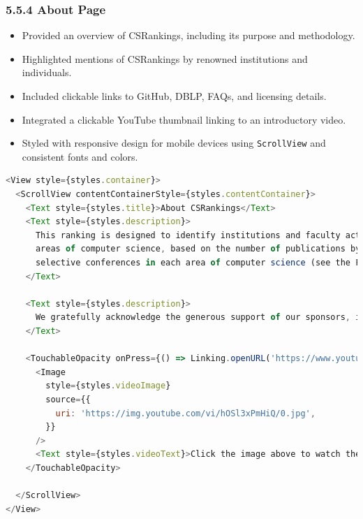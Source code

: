 \documentclass[12pt]{article}
\begin{document}
\subsubsection*{5.5.4 About Page}
\begin{itemize}
    \item Provided an overview of CSRankings, including its purpose and methodology.
    \item Highlighted mentions of CSRankings by renowned institutions and individuals.
    \item Included clickable links to GitHub, DBLP, FAQs, and licensing details.
    \item Integrated a clickable YouTube thumbnail linking to an introductory video.
    \item Styled with responsive design for mobile devices using \texttt{ScrollView} and consistent fonts and colors.
\end{itemize}
\begin{lstlisting}[language=JavaScript, caption={About CSRankings View}, label={lst:AboutCSRankings}]
<View style={styles.container}>
  <ScrollView contentContainerStyle={styles.contentContainer}>
    <Text style={styles.title}>About CSRankings</Text>
    <Text style={styles.description}>
      This ranking is designed to identify institutions and faculty actively engaged in research across a number of
      areas of computer science, based on the number of publications by faculty that have appeared at the most
      selective conferences in each area of computer science (see the FAQ for more details).
    </Text>

    <Text style={styles.description}>
      We gratefully acknowledge the generous support of our sponsors, including Stony Brook University. Sponsor CSrankings.
    </Text>

    <TouchableOpacity onPress={() => Linking.openURL('https://www.youtube.com/watch?v=hOSl3xPmHiQ&t=232s')}>
      <Image
        style={styles.videoImage}
        source={{
          uri: 'https://img.youtube.com/vi/hOSl3xPmHiQ/0.jpg',
        }}
      />
      <Text style={styles.videoText}>Click the image above to watch the introduction video on YouTube.</Text>
    </TouchableOpacity>

  </ScrollView>
</View>
\end{lstlisting}
\end{document}
